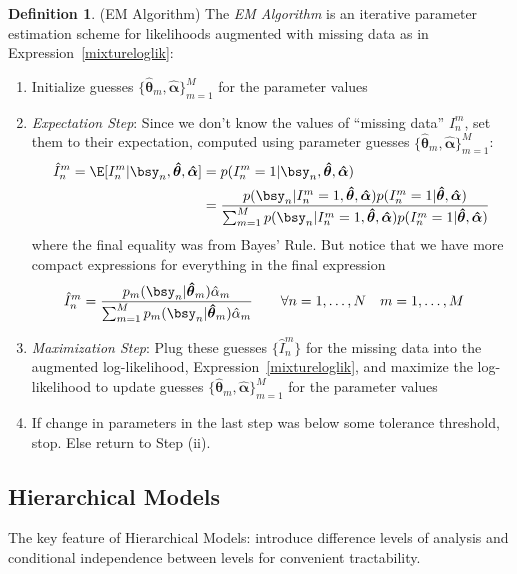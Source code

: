 \documentclass[12pt]{article}
\theoremstyle{plain}
\theoremstyle{definition}
\newtheorem{defn}[thm]{Definition}
\theoremstyle{remark}
\newcommand{\bshatalpha}{\boldsymbol{\hat{\alpha}}}
\newcommand{\bshattheta}{\boldsymbol{\hat{\theta}}}
\begin{document}
\clearpage
\begin{defn}(EM Algorithm)
The \emph{EM Algorithm} is an iterative parameter estimation scheme for
likelihoods augmented with missing data as in
Expression~\ref{mixtureloglik}:
\begin{enumerate}[label=(\roman*)]
  \item
    Initialize guesses $\{\bshattheta_m,\bshatalpha\}_{m=1}^M$ for the
    parameter values
  \item
    \emph{Expectation Step}:
    Since we don't know the values of ``missing data'' $I_n^m$,
    set them to their expectation, computed using parameter guesses
    $\{\bshattheta_m,\bshatalpha\}_{m=1}^M$:
    \begin{align*}
      \hat{I}_n^m
      = \E[I_n^m|\bsy_n,\bshattheta,\bshatalpha]
      &= p(I_n^m=1|\bsy_n,\bshattheta,\bshatalpha)
      \\
      &=
      \frac{p(\bsy_n|I_n^m=1,\bshattheta,\bshatalpha)p(I_n^m=1|\bshattheta,\bshatalpha)}{%
        \sum_{m=1}^M p(\bsy_n|I_n^m=1,\bshattheta,\bshatalpha)p(I_n^m=1|\bshattheta,\bshatalpha)
      }
    \end{align*}
    where the final equality was from Bayes' Rule. But notice that
    we have more compact expressions for everything in the final
    expression
    \begin{align*}
      \hat{I}_n^m
      &=
      \frac{p_m(\bsy_n|\bshattheta_m)\hat{\alpha}_m}{%
        \sum_{m=1}^Mp_m(\bsy_n|\bshattheta_m)\hat{\alpha}_m
      }
      \qquad \forall n=1,\ldots,N\quad m=1,\ldots,M
    \end{align*}
  \item
    \emph{Maximization Step}:
    Plug these guesses $\{\hat{I}_n^m\}$ for the missing data into
    the augmented log-likelihood, Expression~\ref{mixtureloglik}, and
    maximize the log-likelihood to update guesses
    $\{\bshattheta_m,\bshatalpha\}_{m=1}^M$ for the parameter values

  \item
    If change in parameters in the last step was below some tolerance
    threshold, stop. Else return to Step (ii).
\end{enumerate}
\end{defn}

\clearpage
\subsection{Hierarchical Models}

The key feature of Hierarchical Models: introduce difference levels of
analysis and conditional independence between levels for convenient
tractability.
\end{document}
